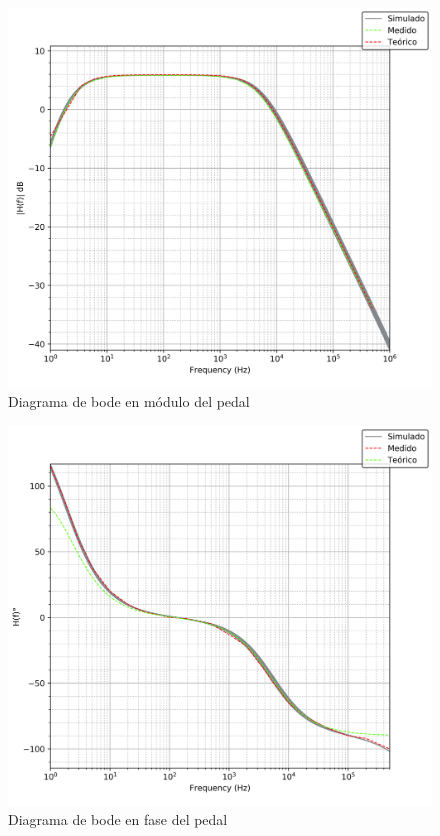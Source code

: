 \begin{figure}[H]
    \centering
    \includegraphics[scale=0.6]{../EJ5/Recursos/bode_modulo.png}
    \caption{Diagrama de bode en m\'odulo del pedal}
    \label{fig:pedal_bode_modulo}
\end{figure}

\begin{figure}[H]
    \centering
    \includegraphics[scale=0.6]{../EJ5/Recursos/bode_fase.png}
    \caption{Diagrama de bode en fase del pedal}
    \label{fig:pedal_bode_fase}
\end{figure}


